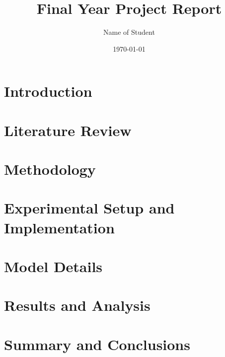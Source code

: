 \documentclass[a4paper,12pt]{report}
\title{Final Year Project Report}
\author{Name of Student}
\date{\today}
\begin{document}


\thispagestyle{empty} %

\pagestyle{fancy} %





\cleardoublepage
{}


\cleardoublepage
{}
\listoffigures

\cleardoublepage
{}
\listoftables

\cleardoublepage
\tableofcontents

\cleardoublepage
{} %
\pagestyle{fancy} %

\chapter{Introduction}

\cleardoublepage

\chapter{Literature Review}

\cleardoublepage

\chapter{Methodology}

\cleardoublepage

\chapter{Experimental Setup and Implementation}

\cleardoublepage

\chapter{Model Details}

\cleardoublepage

\chapter{Results and Analysis}

\cleardoublepage

\chapter{Summary and Conclusions}

\cleardoublepage


\cleardoublepage

\printbibliography[title={References}]
\end{document}
